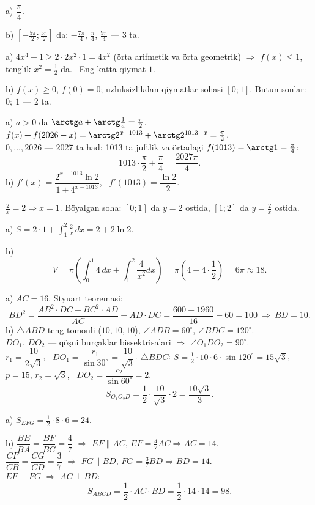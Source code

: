 a) $\dfrac\pi4$.

b) $\left[-\frac{5\pi}2;\frac{5\pi}2\right]$ da: $-\frac{7\pi}4$, $\frac\pi4$, $\frac{9\pi}4$ — 3 ta.

\newpage
{}
a) $4x^4+1\ge2\cdot2x^2\cdot1=4x^2$ (örta arifmetik va örta geometrik) $\Rightarrow$ $f(x)\le1$, tenglik $x^2=\frac12$ da. \ Eng katta qiymat $1$.

b) $f(x)\ge0$, $f(0)=0$; uzluksizlikdan qiymatlar sohasi $[0;1]$. Butun sonlar: $0;\ 1$ — 2 ta.

\newpage
{}
a) $a>0$ da $\arctg a+\arctg\frac1a=\frac\pi2$. \ $f(x)+f(2026-x)=\arctg2^{x-1013}+\arctg2^{1013-x}=\frac\pi2$.\\
$0,\dots,2026$ — 2027 ta had: 1013 ta juftlik va örtadagi $f(1013)=\arctg1=\frac\pi4$:
\[1013\cdot\frac\pi2+\frac\pi4=\frac{2027\pi}4.\]
b) $f'(x)=\dfrac{2^{x-1013}\ln2}{1+4^{x-1013}}$, \ $f'(1013)=\dfrac{\ln2}{2}$.

\newpage
{}
$\frac2x=2\Rightarrow x=1$. Böyalgan soha: $[0;1]$ da $y=2$ ostida, $[1;2]$ da $y=\frac2x$ ostida.

a) $S=2\cdot1+\displaystyle\int_1^2\frac2x\,dx=2+2\ln2$.

b) \[V=\pi\left(\int_0^1 4\,dx+\int_1^2\frac4{x^2}dx\right)=\pi\left(4+4\cdot\frac12\right)=6\pi\approx18.\]

\newpage
{}
a) $AC=16$. Styuart teoremasi:
\[BD^2=\frac{AB^2\cdot DC+BC^2\cdot AD}{AC}-AD\cdot DC=\frac{600+1960}{16}-60=100\ \Rightarrow\ BD=10.\]
b) $\triangle ABD$ teng tomonli ($10,10,10$), $\angle ADB=60^\circ$, $\angle BDC=120^\circ$.\\
$DO_1$, $DO_2$ — qöşni burçaklar bissektrisalari $\Rightarrow$ $\angle O_1DO_2=90^\circ$.\\
$r_1=\dfrac{10}{2\sqrt3}$, \ $DO_1=\dfrac{r_1}{\sin30^\circ}=\dfrac{10}{\sqrt3}$. \quad $\triangle BDC$: $S=\frac12\cdot10\cdot6\cdot\sin120^\circ=15\sqrt3$, $p=15$, $r_2=\sqrt3$, \ $DO_2=\dfrac{r_2}{\sin60^\circ}=2$.
\[S_{O_1O_2D}=\frac12\cdot\frac{10}{\sqrt3}\cdot2=\frac{10\sqrt3}3.\]

\newpage
{}
a) $S_{EFG}=\frac12\cdot8\cdot6=24$.

b) $\dfrac{BE}{BA}=\dfrac{BF}{BC}=\dfrac47$ $\Rightarrow$ $EF\parallel AC$, $EF=\frac47AC\Rightarrow AC=14$.\\
$\dfrac{CF}{CB}=\dfrac{CG}{CD}=\dfrac37$ $\Rightarrow$ $FG\parallel BD$, $FG=\frac37BD\Rightarrow BD=14$.\\
$EF\perp FG$ $\Rightarrow$ $AC\perp BD$:
\[S_{ABCD}=\frac12\cdot AC\cdot BD=\frac12\cdot14\cdot14=98.\]

